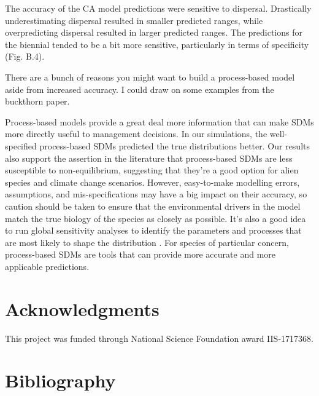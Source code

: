 \documentclass[preprint,review,times,12pt]{elsarticle}
\begin{document}
The accuracy of the CA model predictions were sensitive to dispersal. Drastically underestimating dispersal resulted in smaller predicted ranges, while overpredicting dispersal resulted in larger predicted ranges. The predictions for the biennial tended to be a bit more sensitive, particularly in terms of specificity (Fig. B.4). 

There are a bunch of reasons you might want to build a process-based model aside from increased accuracy. I could draw on some examples from the buckthorn paper.

Process-based models provide a great deal more information that can make SDMs more directly useful to management decisions. In our simulations, the well-specified process-based SDMs predicted the true distributions better. Our results also support the assertion in the literature that process-based SDMs are less susceptible to non-equilibrium, suggesting that they're a good option for alien species and climate change scenarios. However, easy-to-make modelling errors, assumptions, and mis-specifications may have a big impact on their accuracy, so caution should be taken to ensure that the environmental drivers in the model match the true biology of the species as closely as possible. It's also a good idea to run global sensitivity analyses to identify the parameters and processes that are most likely to shape the distribution \citep{Prowse2016,Aiello-Lammens2017}. For species of particular concern, process-based SDMs are tools that can provide more accurate and more applicable predictions.







\section{Acknowledgments}
This project was funded through National Science Foundation award IIS-1717368. 


\section{Bibliography}

\end{document}
